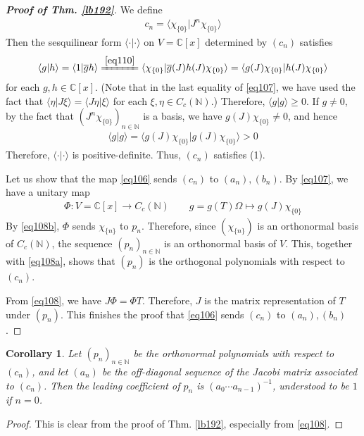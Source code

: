 \documentclass[12pt,b5paper,notitlepage]{article}
\theoremstyle{definition}
\theoremstyle{plain}
\newtheorem{co}[df]{Corollary}
\newcommand{\ovl}{\overline}
\newcommand{\bk}[1]{\langle {#1}\rangle}
\newcommand{\Cbb}{\mathbb C}
\newcommand{\Nbb}{\mathbb N}
\numberwithin{equation}{section}
\begin{document}
\begin{proof}[\textbf{Proof of Thm. \ref{lb192}}]
We define
\begin{align}\label{eq110}
c_n=\bk{\chi_{\{0\}}|J^n\chi_{\{0\}}}
\end{align}
Then the sesquilinear form $\bk{\cdot|\cdot}$ on $V=\Cbb[x]$ determined by $(c_n)$ satisfies
\begin{align}\label{eq107}
\bk{g|h}=\bk{1|\ovl gh}\xlongequal{\eqref{eq110}}\bk{\chi_{\{0\}}|\ovl g(J)h(J)\chi_{\{0\}}}=\bk{g(J)\chi_{\{0\}}|h(J)\chi_{\{0\}}}
\end{align}
for each $g,h\in\Cbb[x]$. (Note that in the last equality of \eqref{eq107}, we have used the fact that $\bk{\eta|J\xi}=\bk{J\eta|\xi}$ for each $\xi,\eta\in C_c(\Nbb)$.) Therefore, $\bk{g|g}\geq0$. If $g\neq0$, by the fact that $(J^n\chi_{\{0\}})_{n\in\Nbb}$ is a basis, we have $g(J)\chi_{\{0\}}\neq0$, and hence
\begin{align*}
\bk{g|g}=\bk{g(J)\chi_{\{0\}}|g(J)\chi_{\{0\}}}>0
\end{align*}
Therefore, $\bk{\cdot|\cdot}$ is positive-definite. Thus, $(c_n)$ satisfies (1).

Let us show that the map \eqref{eq106} sends $(c_n)$ to $(a_n),(b_n)$. By \eqref{eq107}, we have a unitary map
\begin{gather}\label{eq109}
\Phi:V=\Cbb[x]\rightarrow C_c(\Nbb)\qquad g=g(T)\Omega\mapsto g(J)\chi_{\{0\}} 
\end{gather}
By \eqref{eq108b}, $\Phi$ sends $\chi_{\{n\}}$ to $p_n$. Therefore, since $(\chi_{\{n\}})$ is an orthonormal basis of $C_c(\Nbb)$, the sequence $(p_n)_{n\in\Nbb}$ is an orthonormal basis of $V$. This, together with \eqref{eq108a}, shows that $(p_n)$ is the orthogonal polynomials with respect to $(c_n)$. 

From \eqref{eq108}, we have $J\Phi=\Phi T$. Therefore, $J$ is the matrix representation of $T$ under $(p_n)$. This finishes the proof that \eqref{eq106} sends $(c_n)$ to $(a_n),(b_n)$.
\end{proof}



\begin{co}\label{lb197}
Let $(p_n)_{n\in\Nbb}$ be the orthonormal polynomials with respect to $(c_n)$, and let $(a_n)$ be the off-diagonal sequence of the Jacobi matrix associated to $(c_n)$. Then the leading coefficient of $p_n$ is $(a_0\cdots a_{n-1})^{-1}$, understood to be $1$ if $n=0$.
\end{co}

\begin{proof}
This is clear from the proof of Thm. \ref{lb192}, especially from \eqref{eq108}.
\end{proof}
\end{document}
